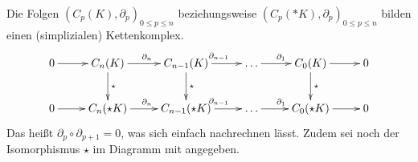   \begin{folgerung}
    Die Folgen \( \left( C_{p}(K), \partial_{p} \right)_{0 \le p \le n} \) beziehungsweise \( \left( C_{p}(*K), \partial_{p} \right)_{0 \le p \le n} \) 
    bilden einen (simplizialen) Kettenkomplex.
    \begin{align}
      \begin{xy}
        \xymatrix{
          0 \ar[r] & 
          C_{n}(K) \ar[r]^{\partial_{n}} \ar[d]^{\star} & 
          C_{n-1}(K) \ar[r]^{\partial_{n-1}} \ar[d]^{\star} & 
          \ldots \ar[r]^{\partial_{1}} & 
          C_{0}(K) \ar[r] \ar[d]^{\star} &
          0 \\
          0 \ar[r] & 
          C_{n}(\star K) \ar[r]^{\partial_{n}} & 
          C_{n-1}( \star K) \ar[r]^{\partial_{n-1}} & 
          \ldots \ar[r]^{\partial_{1}} & 
          C_{0}(\star K) \ar[r] &
          0 
        }
      \end{xy}
    \end{align}
    Das heißt \( \partial_{p} \circ \partial_{p+1} = 0\), was sich einfach nachrechnen lässt.
    Zudem sei noch der Isomorphismus \( \star \) im Diagramm mit angegeben.
  \end{folgerung}


